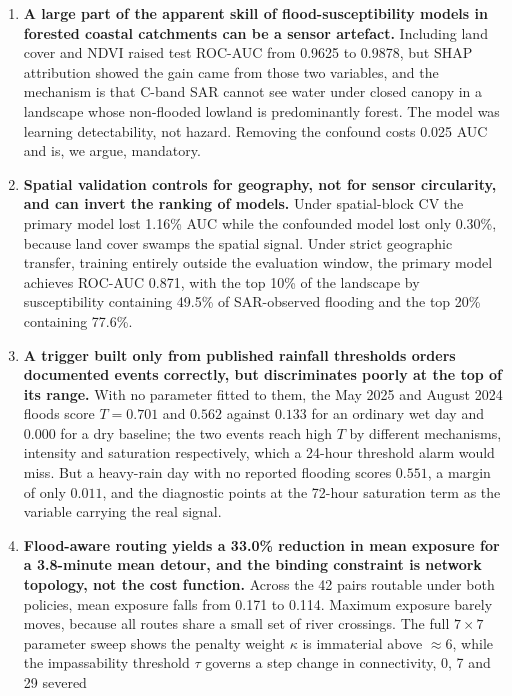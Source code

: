 \documentclass[11pt,a4paper]{article}
\begin{document}
\begin{enumerate}
\itemsep3pt
\item \textbf{A large part of the apparent skill of flood-susceptibility models
      in forested coastal catchments can be a sensor artefact.} Including land
      cover and NDVI raised test ROC-AUC from 0.9625 to 0.9878, but SHAP
      attribution showed the gain came from those two variables, and the
      mechanism is that C-band SAR cannot see water under closed canopy in a
      landscape whose non-flooded lowland is predominantly forest. The model was
      learning detectability, not hazard. Removing the confound costs 0.025 AUC
      and is, we argue, mandatory.
\item \textbf{Spatial validation controls for geography, not for sensor
      circularity, and can invert the ranking of models.} Under spatial-block CV
      the primary model lost 1.16\% AUC while the confounded model lost only
      0.30\%, because land cover swamps the spatial signal. Under strict
      geographic transfer, training entirely outside the evaluation window, the
      primary model achieves ROC-AUC 0.871, with the top 10\% of the landscape by
      susceptibility containing 49.5\% of SAR-observed flooding and the top 20\%
      containing 77.6\%.
\item \textbf{A trigger built only from published rainfall thresholds orders
      documented events correctly, but discriminates poorly at the top of its
      range.} With no parameter fitted to them, the May 2025 and August 2024
      floods score $T=0.701$ and $0.562$ against $0.133$ for an ordinary wet day
      and $0.000$ for a dry baseline; the two events reach high $T$ by different
      mechanisms, intensity and saturation respectively, which a 24-hour
      threshold alarm would miss. But a heavy-rain day with no reported flooding
      scores $0.551$, a margin of only $0.011$, and the diagnostic points at the
      72-hour saturation term as the variable carrying the real signal.
\item \textbf{Flood-aware routing yields a 33.0\% reduction in mean exposure for a
      3.8-minute mean detour, and the binding constraint is network topology, not
      the cost function.} Across the 42 pairs routable under both policies,
      mean exposure falls from 0.171 to 0.114. Maximum exposure barely moves, because all routes share a small set
      of river crossings. The full $7\times7$ parameter sweep shows the penalty
      weight $\kappa$ is immaterial above $\approx6$, while the impassability
      threshold $\tau$ governs a step change in connectivity, 0, 7 and 29 severed

\end{enumerate}
\end{document}
